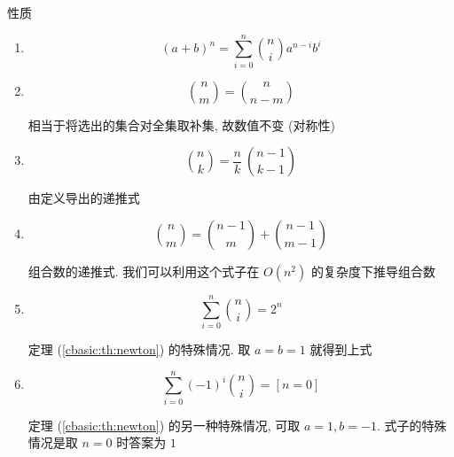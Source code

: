 \begin{frame}[allowframebreaks]{性质}
	\label{cbasic:prop:pcn}

	\begin{enumerate}
		\item \begin{theorem}[二项式定理]
			      \label{cbasic:th:newton}
			      \begin{equation}
				      \label{cbasic:eq:newton}
				      (a+b)^n=\sum_{i=0}^n\binom{n}{i}a^{n-i}b^i
			      \end{equation}
		      \end{theorem}

		\item \begin{equation}
			      \label{cbasic:eq:prop1}
			      \binom{n}{m}=\binom{n}{n-m}
		      \end{equation}

		      相当于将选出的集合对全集取补集, 故数值不变 (对称性)

		\item \begin{equation}
			      \label{cbasic:eq:prop2}
			      \binom{n}{k} = \frac{n}{k}\ \binom{n-1}{k-1}
		      \end{equation}

		      由定义导出的递推式

		\item \begin{equation}
			      \label{cbasic:eq:prop3}
			      \binom{n}{m}=\binom{n-1}{m}+\binom{n-1}{m-1}
		      \end{equation}

		      组合数的递推式. 我们可以利用这个式子在 $O(n^2)$ 的复杂度下推导组合数

		\item \begin{equation}
			      \label{cbasic:eq:prop4}
			      \sum_{i=0}^n\binom{n}{i}=2^n
		      \end{equation}

		      定理 (\ref{cbasic:th:newton}) 的特殊情况. 取 $a=b=1$ 就得到上式

		\item \begin{equation}
			      \label{cbasic:eq:prop5}
			      \sum_{i=0}^n(-1)^i\binom{n}{i}=[n=0]
		      \end{equation}

		      定理 (\ref{cbasic:th:newton}) 的另一种特殊情况, 可取 $a=1, b=-1$. 式子的特殊情况是取 $n=0$ 时答案为 $1$


\end{enumerate}
\end{frame}
